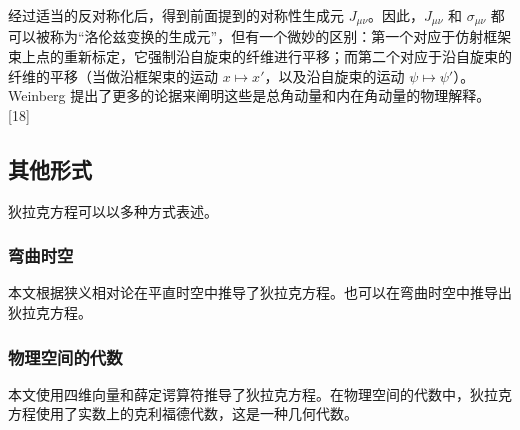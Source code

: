 经过适当的反对称化后，得到前面提到的对称性生成元 \( J_{\mu \nu} \)。因此，\( J_{\mu \nu} \) 和 \( \sigma_{\mu \nu} \) 都可以被称为“洛伦兹变换的生成元”，但有一个微妙的区别：第一个对应于仿射框架束上点的重新标定，它强制沿自旋束的纤维进行平移；而第二个对应于沿自旋束的纤维的平移（当做沿框架束的运动 \( x \mapsto x' \)，以及沿自旋束的运动 \( \psi \mapsto \psi' \)）。Weinberg 提出了更多的论据来阐明这些是总角动量和内在角动量的物理解释。[18]
\subsection{其他形式}
狄拉克方程可以以多种方式表述。
\subsubsection{弯曲时空}
本文根据狭义相对论在平直时空中推导了狄拉克方程。也可以在弯曲时空中推导出狄拉克方程。
\subsubsection{物理空间的代数}
本文使用四维向量和薛定谔算符推导了狄拉克方程。在物理空间的代数中，狄拉克方程使用了实数上的克利福德代数，这是一种几何代数。
